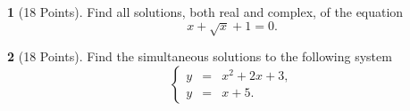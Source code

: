 \documentclass[12pt]{amsart}
\theoremstyle{definition}
\newtheorem{thm}{}
\theoremstyle{definition}
\begin{document}
\newpage
\begin{thm}[18 Points]\label{ex9}
  Find all solutions, both real and complex, of the equation
  $$x + \sqrt{x} + 1 = 0.$$
  \vspace{3in}
\end{thm}

\begin{thm}[18 Points]\label{ex9}
  Find the simultaneous solutions to the following system
  $$\left\{\begin{array}{rcl}
    y &=& x^2 + 2x + 3,\\
    y &=& x + 5.
  \end{array}\right.$$
  \vspace{2in}
\end{thm}
\end{document}
